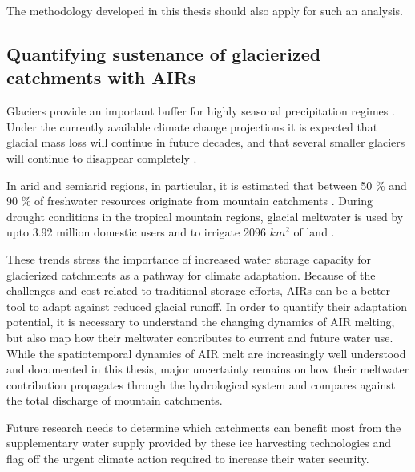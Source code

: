 The methodology developed in this thesis should also apply for such an analysis.

\subsection{Quantifying sustenance of glacierized catchments with AIRs}

Glaciers provide an important buffer for highly seasonal precipitation regimes
\citep{kaserContributionPotentialGlaciers2010}. Under the currently available climate change projections it is
expected that glacial mass loss will continue in future decades, and that several smaller glaciers will continue
to disappear completely \citep{rabatelCurrentStateGlaciers2013}. 

In arid and semiarid regions, in particular, it is estimated that between 50 \% and 90 \% of freshwater
resources originate from mountain catchments \citep{messerliMountainsWorldVulnerable2004}. During drought
conditions in the tropical mountain regions, glacial meltwater is used by upto 3.92 million domestic users and
to irrigate 2096 $km^2$ of land \citep{buytaertGlacialMeltContent2017}.  

These trends stress the importance of increased water storage capacity for glacierized catchments as a pathway
for climate adaptation. Because of the challenges and cost related to traditional storage efforts, AIRs can be
a better tool to adapt against reduced glacial runoff. In order to quantify their adaptation potential, it
is necessary to understand the changing dynamics of AIR melting, but also map how their meltwater contributes to
current and future water use. While the spatiotemporal dynamics of AIR melt are increasingly well understood and
documented in this thesis, major uncertainty remains on how their meltwater contribution propagates through the
hydrological system and compares against the total discharge of mountain catchments. 

Future research needs to determine which catchments can benefit most from the supplementary water supply
provided by these ice harvesting technologies and flag off the urgent climate action required to increase their
water security.

